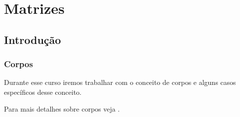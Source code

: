 \chapter{Matrizes}
\section{Introdução}

\subsection{Corpos}
Durante esse curso iremos trabalhar com o conceito de corpos e alguns casos específicos desse conceito.

Para mais detalhes sobre corpos veja \cite{Hygino:2019}.


